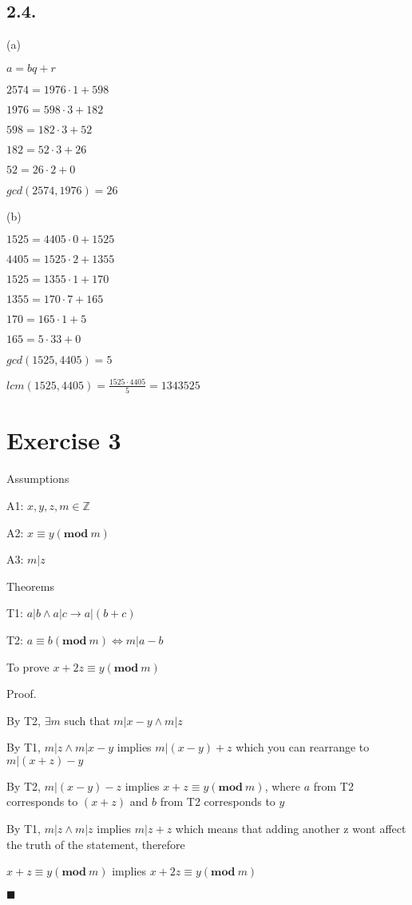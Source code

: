\documentclass[a4paper,11pt]{article}
\newcommand*{\QEDA}{\hfill\ensuremath{\blacksquare}}%
\begin{document}
\subsection*{2.4.}
(a)

$a = bq + r$

$2574 = 1976 \cdot 1 + 598$

$1976 = 598 \cdot 3 + 182$

$598 = 182 \cdot 3 + 52$

$182 = 52 \cdot 3 + 26$

$52 = 26 \cdot 2 + 0$

$gcd(2574,1976) = 26$

\noindent (b)

$1525 = 4405 \cdot 0 + 1525$

$4405 = 1525 \cdot 2 + 1355$

$1525 = 1355 \cdot 1 + 170$

$1355 = 170 \cdot 7 + 165$

$170 = 165 \cdot 1 + 5$

$165 = 5 \cdot 33 + 0$

$gcd(1525,4405) = 5$

$lcm(1525, 4405) = \frac{1525 \cdot 4405}{5} = 1343525$

\newpage
\section*{Exercise 3}

\noindent Assumptions

A1: $x,y,z,m \in \mathbb{Z}$

A2: $x \equiv y (\mathbf{mod}\ m)$

A3: $m|z$

\noindent Theorems

T1: $a|b \land a|c \to a | (b+c)$

T2: $a \equiv b (\mathbf{mod}\ m) \iff m | a - b$

\noindent To prove $x+2z \equiv y (\mathbf{mod}\ m)$

\noindent Proof.

By T2, $\exists m$ such that $m|x-y \land m|z$

By T1, $m|z \land m|x-y$ implies $m|(x-y)+z$ which you can rearrange to $m | (x+z)-y$

By T2, $m | (x-y) - z$ implies $x+z \equiv y (\mathbf{mod}\ m)$, where $a$ from T2 corresponds to $(x+z)$ and $b$ from T2 corresponds to $y$

By T1, $m|z \land m|z$ implies $m | z+z$ which means that adding another z wont affect the truth of the statement, therefore

$x+z \equiv y (\mathbf{mod}\ m)$ implies $x+2z \equiv y (\mathbf{mod}\ m)$

\QEDA
\end{document}
